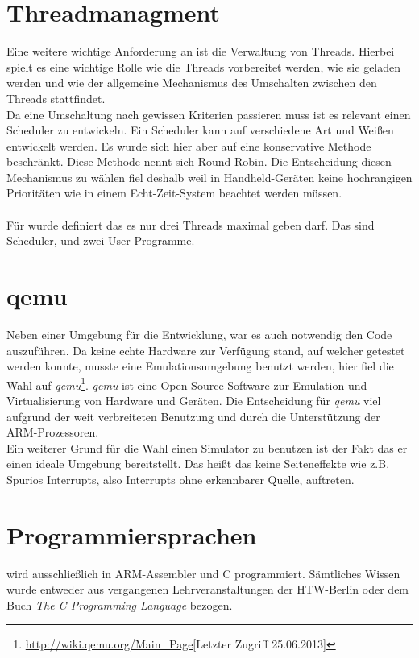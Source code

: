 \section{Threadmanagment}
Eine weitere wichtige Anforderung an \mops ist die Verwaltung von Threads. Hierbei spielt es eine wichtige Rolle wie die Threads vorbereitet werden, wie sie geladen werden und wie der allgemeine Mechanismus des Umschalten zwischen den Threads stattfindet.\\
Da eine Umschaltung nach gewissen Kriterien passieren muss ist es relevant einen Scheduler zu entwickeln. Ein Scheduler kann auf verschiedene Art und Wei\ss en entwickelt werden. Es wurde sich hier aber auf  eine konservative Methode beschr\"ankt. Diese Methode nennt sich Round-Robin. Die Entscheidung diesen Mechanismus zu w\"ahlen fiel deshalb weil in Handheld-Ger\"aten keine hochrangigen Priorit\"aten wie in einem Echt-Zeit-System beachtet werden m\"ussen.\\ \\
F\"ur \mops wurde definiert das es nur drei Threads maximal geben darf. Das sind Scheduler, und zwei User-Programme.
\section{qemu}
Neben einer Umgebung f\"ur die Entwicklung, war es auch notwendig den Code auszuf\"uhren. Da keine echte Hardware zur Verf\"ugung stand, auf welcher \mops getestet werden konnte, musste eine Emulationsumgebung benutzt werden, hier fiel die Wahl auf \textit{qemu}\footnote{\url{http://wiki.qemu.org/Main_Page}[Letzter Zugriff 25.06.2013]}. \textit{qemu} ist eine Open Source Software zur Emulation und Virtualisierung von Hardware und Ger\"aten. Die Entscheidung f\"ur \textit{qemu} viel aufgrund der weit verbreiteten Benutzung und durch die Unterst\"utzung der ARM-Prozessoren.\\
Ein weiterer Grund f\"ur die Wahl einen Simulator zu benutzen ist der Fakt das er einen ideale Umgebung bereitstellt. Das hei\ss t das keine Seiteneffekte wie z.B. Spurios Interrupts, also Interrupts ohne erkennbarer Quelle, auftreten.
\section{Programmiersprachen}
\mops wird ausschlie\ss lich in ARM-Assembler und C programmiert. S\"amtliches Wissen wurde entweder aus vergangenen Lehrveranstaltungen der HTW-Berlin oder dem Buch \textit{The C Programming Language}\parencite{clanguage} bezogen.
